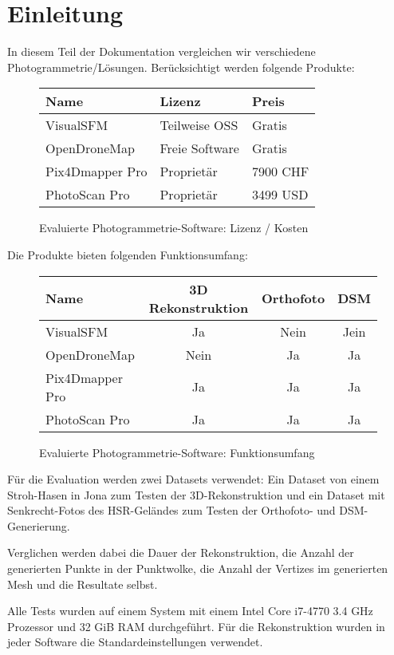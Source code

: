 \chapter{Einleitung}

\label{ch:eval-intro}


In diesem Teil der Dokumentation vergleichen wir verschiedene
Photogrammetrie\-/Lösungen. Berücksichtigt werden folgende Produkte:

\begin{figure}[H]
	\begin{tabularx}{\textwidth}{XXl}
		\toprule
		\textbf{Name} & \textbf{Lizenz} & \textbf{Preis} \\
		\midrule
		VisualSFM & Teilweise OSS & Gratis \\
		OpenDroneMap & Freie Software & Gratis \\
		Pix4Dmapper Pro & Proprietär & 7900 CHF \\
		PhotoScan Pro & Proprietär & 3499 USD \\
		\bottomrule
	\end{tabularx}
	\caption{Evaluierte Photogrammetrie-Software: Lizenz / Kosten}
	\label{table:eval:software-license}
\end{figure}

\noindent Die Produkte bieten folgenden Funktionsumfang:

\begin{figure}[H]
	\begin{tabularx}{\textwidth}[H]{Xccc}
		\toprule
		\textbf{Name} & \textbf{3D Rekonstruktion} & \textbf{Orthofoto} & \textbf{DSM} \\
		\midrule
		VisualSFM & Ja & Nein & Jein \\
		OpenDroneMap & Nein & Ja & Ja \\
		Pix4Dmapper Pro & Ja & Ja & Ja \\
		PhotoScan Pro & Ja & Ja & Ja \\
		\bottomrule
	\end{tabularx}
	\caption{Evaluierte Photogrammetrie-Software: Funktionsumfang}
	\label{table:eval:software-capabilities}
\end{figure}

Für die Evaluation werden zwei Datasets verwendet: Ein Dataset von einem
Stroh-Hasen in Jona zum Testen der 3D-Rekonstruktion und ein Dataset mit
Senkrecht-Fotos des HSR-Geländes zum Testen der Orthofoto- und DSM-Generierung.

Verglichen werden dabei die Dauer der Rekonstruktion, die Anzahl der generierten
Punkte in der Punktwolke, die Anzahl der Vertizes im generierten Mesh und die
Resultate selbst.

Alle Tests wurden auf einem System mit einem Intel Core i7-4770 3.4 GHz
Prozessor und 32 GiB RAM durchgeführt. Für die Rekonstruktion wurden in jeder
Software die Standardeinstellungen verwendet.


